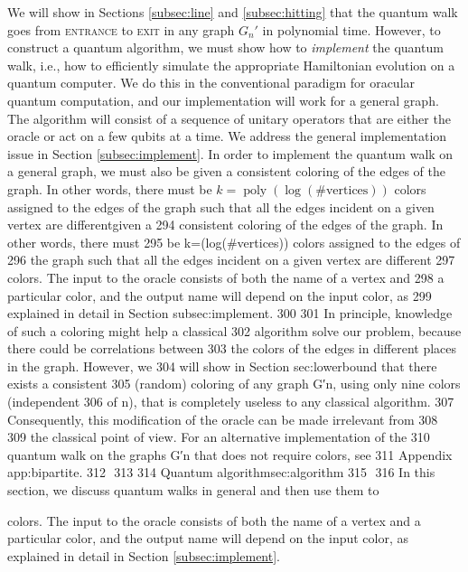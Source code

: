 \documentclass[aps,11pt,twoside,nofootinbib,tightenlines,superscriptaddress,preprintnumbers]{revtex4}
\newcommand{\<}{\langle}
\renewcommand{\>}{\rangle}
\newcommand{\poly}{\mathop{\mathrm{poly}}\nolimits}
\begin{document}
We will show in Sections \ref{subsec:line} and \ref{subsec:hitting} that
the quantum walk goes from {\scshape entrance} to {\scshape exit} in any
graph $G_n'$ in polynomial time.  However, to construct a quantum
algorithm, we must show how to {\it implement} the quantum walk, i.e., how
to efficiently simulate the appropriate Hamiltonian evolution on a quantum
computer.  We do this in the conventional paradigm for oracular quantum
computation, and our implementation will work for a general graph.  The
algorithm will consist of a sequence of unitary operators that are either
the oracle or act on a few qubits at a time.  We address the general
implementation issue in Section \ref{subsec:implement}.  In order to
implement the quantum walk on a general graph, we must also be given a
consistent coloring of the edges of the graph.  In other words, there must
be $k=\poly(\log(\# \mathrm{vertices}))$ colors assigned to the edges of
the graph such that all the edges incident on a given vertex are differentgiven a
294
consistent coloring of the edges of the graph.  In other words, there must
295
be k=\poly(log(#vertices)) colors assigned to the edges of
296
the graph such that all the edges incident on a given vertex are different
297
colors.  The input to the oracle consists of both the name of a vertex and
298
a particular color, and the output name will depend on the input color, as
299
explained in detail in Section {subsec:implement}.
300
​
301
In principle, knowledge of such a coloring might help a classical
302
algorithm solve our problem, because there could be correlations between
303
the colors of the edges in different places in the graph.  However, we
304
will show in Section {sec:lowerbound} that there exists a consistent
305
(random) coloring of any graph G′n, using only nine colors (independent
306
of n), that is completely useless to any classical algorithm.
307
Consequently, this modification of the oracle can be made irrelevant from 
308
​
309
the classical point of view.  For an alternative implementation of the
310
quantum walk on the graphs G′n that does not require colors, see
311
Appendix {app:bipartite}.
312
​
313
314
{Quantum algorithm}{sec:algorithm}
315
​
316
In this section, we discuss quantum walks in general and then use them to

colors.  The input to the oracle consists of both the name of a vertex and
a particular color, and the output name will depend on the input color, as
explained in detail in Section \ref{subsec:implement}.
\end{document}
